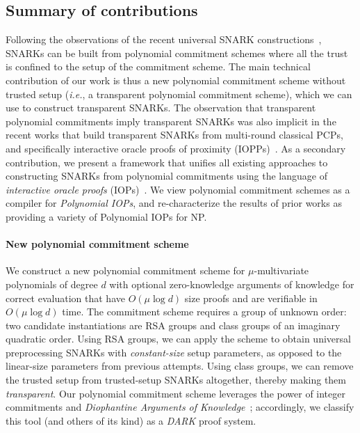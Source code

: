 \subsection{Summary of contributions} 
Following the observations of the recent universal SNARK constructions~\cite{Plonk,Sonic,Libra}, SNARKs can be built from polynomial commitment schemes where all the trust is confined to the setup of the commitment scheme. The main technical contribution of our work is thus a new polynomial commitment scheme without trusted setup (\emph{i.e.}, a transparent polynomial commitment scheme), which we can use to construct transparent SNARKs. The observation that transparent polynomial commitments imply transparent SNARKs was also implicit in the recent works that build transparent SNARKs from multi-round classical PCPs, and specifically interactive oracle proofs of proximity (IOPPs)~\cite{ICALP:BBHR18}. As a secondary contribution, we present a framework that unifies all existing approaches to constructing SNARKs from polynomial commitments using the language of \emph{interactive oracle proofs} (IOPs)~\cite{STOC:ReiRotRot16,TCC:BenChiSpo16}. We view polynomial commitment schemes as a compiler for \emph{Polynomial IOPs}, and re-characterize the results of prior works as providing a variety of Polynomial IOPs for NP. 

\paragraph{New polynomial commitment scheme} We construct a new polynomial commitment scheme for $\mu$-multivariate polynomials of degree $d$ with optional zero-knowledge arguments of knowledge for correct evaluation that have $O(\mu \log d)$ size proofs and are verifiable in $O(\mu \log d)$ time. The commitment scheme requires a group of unknown order: two candidate instantiations are RSA groups and class groups of an imaginary quadratic order. Using RSA groups, we can apply the scheme to obtain universal preprocessing SNARKs with \emph{constant-size} %
setup parameters, as opposed to the linear-size parameters from previous attempts. Using class groups, we can remove the trusted setup from trusted-setup SNARKs altogether, thereby making them \emph{transparent}. Our polynomial commitment scheme leverages the power of integer commitments and \emph{Diophantine Arguments of Knowledge}~\cite{AC:Lipmaa03a}; accordingly, we classify this tool (and others of its kind) as a \emph{DARK} proof system.

